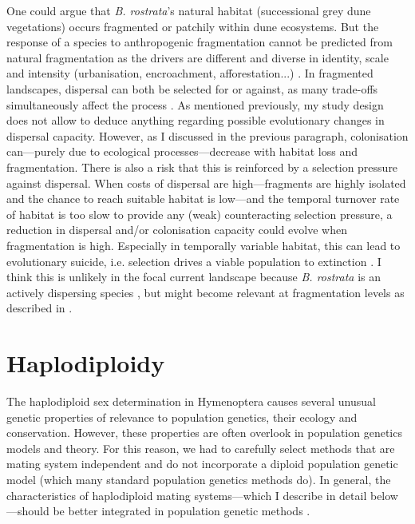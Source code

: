 \documentclass[10pt, twoside]{book} %
\begin{document}
	One could argue that \textit{B. rostrata}'s natural habitat (successional grey dune vegetations) occurs fragmented or patchily within dune ecosystems. But the response of a species to anthropogenic fragmentation cannot be predicted from natural fragmentation as the drivers are different and diverse in identity, scale and intensity (urbanisation, encroachment, afforestation...) \citep{cheptou2017}. In fragmented landscapes, dispersal can both be selected for or against, as many trade-offs simultaneously affect the process \citep{bonte2012}. As mentioned previously, my study design does not allow to deduce anything regarding possible evolutionary changes in dispersal capacity. However, as I discussed in the previous paragraph, colonisation can---purely due to ecological processes---decrease with habitat loss and fragmentation. There is also a risk that this is reinforced by a selection pressure against dispersal. When costs of dispersal are high---fragments are highly isolated and the chance to reach suitable habitat is low---and the temporal turnover rate of habitat is too slow to provide any (weak) counteracting selection pressure, a reduction in dispersal and/or colonisation capacity could evolve when fragmentation is high. Especially in temporally variable habitat, this can lead to evolutionary suicide, i.e. selection drives a viable population to extinction \citep{gyllenberg2002, parvinen2003, poethke2003}. I think this is unlikely in the focal current landscape because \textit{B. rostrata} is an actively dispersing species \citep{lima1996, bonte2010, cheptou2017}, but might become relevant at fragmentation levels as described in \citet{bogusch2021}.\\
	
	\section{Haplodiploidy}\label{haplodiploidy}
	The haplodiploid sex determination in Hymenoptera causes several unusual genetic properties of relevance to population genetics, their ecology and conservation. However, these properties are often overlook in population genetics models and theory. For this reason, we had to carefully select methods that are mating system independent and do not incorporate a diploid population genetic model (which many standard population genetics methods do). In general, the characteristics of haplodiploid mating systems---which I describe in detail below---should be better integrated in population genetic methods \citep{zayed2004, zayed2009}.\\
	
\end{document}

